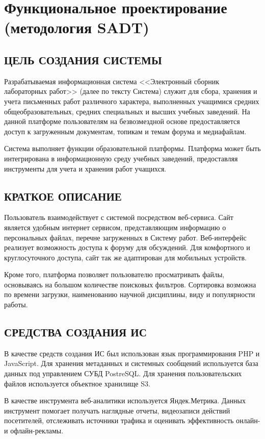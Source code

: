 \documentclass[a4paper,14pt]{extarticle}
\begin{document}
\newpage
\section{Функциональное проектирование\\(методология SADT)}
\subsection{ЦЕЛЬ СОЗДАНИЯ СИСТЕМЫ}
Разрабатываемая информационная система <<Электронный сборник лабораторных работ>> (далее по тексту Система) служит для сбора, хранения и учета письменных работ различного характера, выполненных учащимися средних общеобразовательных, средних специальных и высших учебных заведений. На данной платформе пользователям на безвозмездной основе предоставляется доступ к загруженным документам, топикам и темам форума и медиафайлам. 

Система выполняет функции образовательной платформы. Платформа может быть интегрирована в информационную среду учебных заведений, предоставляя инструменты для учета и хранения работ учащихся. 


\subsection{КРАТКОЕ ОПИСАНИЕ}

Пользователь взаимодействует с системой посредством веб-сервиса.  Сайт является удобным
интернет сервисом, представляющим информацию о персональных файлах, перечне загруженных в Систему работ. Веб-интерфейс реализует возможность доступа к форуму для обсуждений. Для комфортного и
круглосуточного доступа, сайт так же адаптирован для мобильных устройств.

Кроме того, платформа позволяет пользователю просматривать файлы, основываясь на большом количестве поисковых фильтров. Сортировка возможна по времени загрузки, наименованию научной дисциплины, виду и популярности работы.


\subsection{СРЕДСТВА СОЗДАНИЯ ИС}
В качестве средств создания ИС был использован язык программирования PHP и JavaScript. Для хранения метаданных и системных сообщений используется база данных под управлением СУБД PostreSQL. Для хранения пользовательских файлов используется объектное хранилище S3.

В качестве инструмента веб-аналитики используется Яндек.Метрика. Данных инструмент помогает получать наглядные отчеты, видеозаписи действий посетителей, отслеживать источники трафика и оценивать эффективность онлайн- и офлайн-рекламы.
\end{document}
